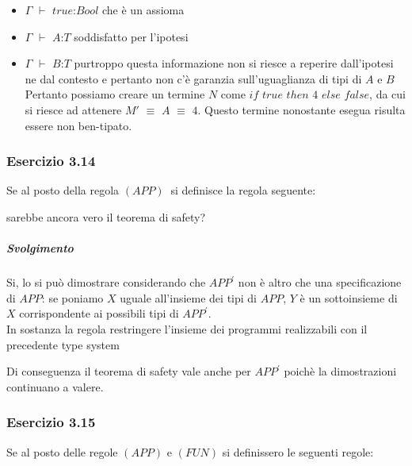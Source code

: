 \begin{itemize}
\item $\Gamma$ $\vdash$ $true$:$Bool$ che \`e un assioma
\item $\Gamma$ $\vdash$ $A$:$T$ soddisfatto per l'ipotesi 
\item  $\Gamma$ $\vdash$ $B$:$T$ purtroppo questa informazione non si riesce a reperire dall'ipotesi ne dal contesto e pertanto non c'\`e garanzia sull'uguaglianza di tipi di $A$ e $B$\\
Pertanto possiamo creare un termine $N$ come $if$ $true$ $then$ $4$ $else$ $false$, da cui si riesce ad attenere $M'$ $\equiv$ $A$ $\equiv$ $4$. Questo termine nonostante esegua risulta essere non ben-tipato.


\end{itemize}







\subsubsection*{Esercizio 3.14}
Se al posto della regola $(APP)\:$ si definisce la regola seguente:

\begin{prooftree} 
	
\end{prooftree} 

sarebbe ancora vero il teorema di safety?
\subparagraph*{Svolgimento}
Si, lo si pu\`o dimostrare considerando che $APP^{\prime}$ non \`e altro che una specificazione di $APP$: se poniamo $X$ uguale all'insieme dei tipi di $APP$, $Y$ \`e un sottoinsieme di $X$ corrispondente ai possibili tipi di $APP^{\prime}$.\\
In sostanza la regola restringere l'insieme dei programmi realizzabili con il precedente type system

Di conseguenza il teorema di safety vale anche per $APP^{\prime}$ poich\`e la dimostrazioni continuano a valere.

\subsubsection*{Esercizio 3.15}
Se al posto delle regole $(APP)$ e $(FUN)$ si definissero le seguenti regole:
\begin{prooftree} 
	
\end{prooftree} 

